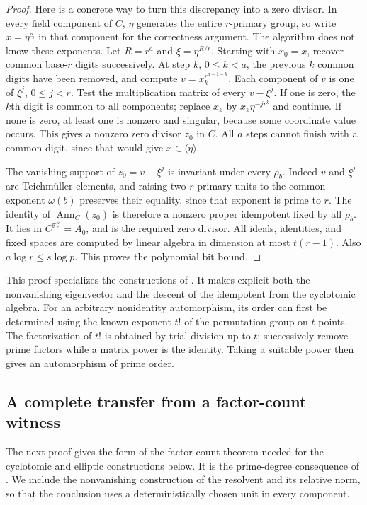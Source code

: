 \documentclass[11pt]{article}
\newcommand{\F}{\mathbb F}
\theoremstyle{definition}
\theoremstyle{remark}
\begin{document}
\begin{proof}
Here is a concrete way to turn this discrepancy into
a zero divisor.  In every field component of $C$,
$\eta$ generates the entire $r$-primary group, so
write $x=\eta^{c_i}$ in that component for the
correctness argument.  The algorithm does not know
these exponents.  Let $R=r^a$ and
$\xi=\eta^{R/r}$.  Starting with $x_0=x$,
recover common base-$r$ digits successively.  At step
$k$, $0\leq k<a$, the previous $k$ common digits
have been removed, and compute
$v=x_k^{r^{a-1-k}}$.
Each component of $v$ is one of $\xi^j$, $0\leq j<r$.
Test the multiplication matrix of every $v-\xi^j$.
If one is zero, the $k$th digit is common to all
components; replace $x_k$ by $x_k\eta^{-jr^k}$ and
continue.  If none is zero, at least one is nonzero
and singular, because some coordinate value occurs.
This gives a nonzero zero divisor $z_0$ in $C$.
All $a$ steps cannot finish with a common digit,
since that would give $x\in\langle\eta\rangle$.

The vanishing support of $z_0=v-\xi^j$ is invariant
under every $\rho_b$.  Indeed $v$ and $\xi^j$ are
Teichm\"uller elements, and raising two $r$-primary
units to the common exponent $\omega(b)$ preserves
their equality, since that exponent is prime to $r$.
The identity of $\operatorname{Ann}_C(z_0)$ is therefore
a nonzero proper idempotent fixed by all $\rho_b$.
It lies in $C^{\F_r^\times}=A_0$, and is the
required zero divisor.
All ideals, identities, and fixed spaces are computed
by linear algebra in dimension at most $t(r-1)$.
Also $a\log r\leq s\log p$.  This proves the
polynomial bit bound.
\end{proof}

This proof specializes the constructions of
\citet[Lemma~4.2, author p.~16; Proposition~4.6, pp.~18--19]{IKRS2012}.
It makes explicit both the nonvanishing eigenvector and
the descent of the idempotent from the cyclotomic algebra.
For an arbitrary nonidentity automorphism, its order
can first be determined using the known exponent $t!$
of the permutation group on $t$ points.  The factorization
of $t!$ is obtained by trial division up to $t$;
successively remove prime factors while a matrix power
is the identity.  Taking a suitable power then gives
an automorphism of prime order.

\subsection{A complete transfer from a factor-count witness}
The next proof gives the form of the factor-count theorem needed for
the cyclotomic and elliptic constructions below. It is the prime-degree
consequence of \citet[Theorems~1.2 and 1.4, p.~2]{BhargavaEtAl2017}.
We include the nonvanishing construction of the resolvent and its
relative norm, so that the conclusion uses a deterministically chosen
unit in every component.
\end{document}
